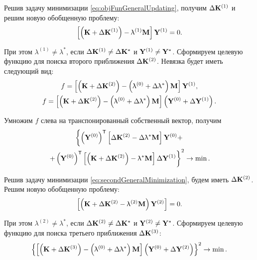 Решив задачу минимизации \eqref{eq:objFunGeneralUpdating}, получим $ \Delta \mathbf{K} ^ {(1)} $ и решим новую обобщенную проблему:
\begin{equation}
	\left[ \left( \mathbf{K} + \Delta \mathbf{K} ^ {(1)} \right) - \uplambda ^ {(1)} \mathbf{M} \right] \mathbf{Y} ^ {(1)} = 0.
\end{equation}

При этом $ \lambda ^ {(1)} \neq \lambda ^ \ast $, если $ \Delta \mathbf{K} ^ {(1)} \neq \Delta \mathbf{K} ^ \ast $ и $ \mathbf{Y} ^ {(1)} \neq \mathbf{Y} ^ \ast $. Сформируем целевую функцию для поиска второго приближения $ \Delta \mathbf{K} ^ {(2)} $. Невязка будет иметь следующий вид:
\begin{gather*}
	f = \left[ \left( \mathbf{K} + \Delta \mathbf{K} ^ {(2)} \right) - \left( \uplambda ^ {(0)} + \Delta \uplambda ^ \ast \right) \mathbf{M} \right] \mathbf{Y} ^ {(1)}, \\
	f = \left[ \left( \mathbf{K} + \Delta \mathbf{K} ^ {(2)} \right) - \left( \uplambda ^ {(0)} + \Delta \uplambda ^ \ast \right) \mathbf{M} \right] \left( \mathbf{Y} ^ {(0)} + \Delta \mathbf{Y} ^ {(1)} \right).
\end{gather*}

Умножим $ f $ слева на транспонированный собственный вектор, получим
\begin{gather}
	\left\{ \left( \mathbf{Y} ^ {(0)} \right) ^ \mathsf{T} \left[ \Delta \mathbf{K} ^ {(2)} - \Delta \uplambda ^ \ast \mathbf{M} \right] \mathbf{Y} ^ {(0)} + \right. \nonumber \\
	\left. + \left( \mathbf{Y} ^ {(0)} \right) ^ \mathsf{T} \left[ \left( \mathbf{K} + \Delta \mathbf{K} ^ {(2)} \right) - \uplambda ^ \ast \mathbf{M} \right] \Delta \mathbf{Y} ^ {(1)} \right\} ^ 2 \rightarrow \min.
	\label{eq:secondGeneralMinimization}
\end{gather}

Решив задачу минимизации \eqref{eq:secondGeneralMinimization}, будем иметь $ \Delta \mathbf{K} ^ {(2)} $. Решим новую обобщенную проблему:
\begin{equation*}
	\left[ \left( \mathbf{K} + \Delta \mathbf{K} ^ {(2)} - \uplambda ^ {(2)} \mathbf{M} \right) \mathbf{Y} ^ {(2)} \right] = 0.
\end{equation*}

При этом $ \lambda ^ {(2)} \neq \lambda ^ \ast $, если $ \Delta \mathbf{K} ^ {(2)} \neq \Delta \mathbf{K} ^ \ast $ и $ \mathbf{Y} ^ {(2)} \neq \mathbf{Y} ^ \ast $. Сформируем целевую функцию для поиска третьего приближения $ \Delta \mathbf{K} ^ {(3)} $:
\begin{equation*}
	\left\{ \left[ \left( \mathbf{K} + \Delta \mathbf{K} ^ {(3)} \right) - \left( \uplambda ^ {(0)} + \Delta \uplambda ^ \ast \right) \mathbf{M} \right] \left( \mathbf{Y} ^ {(0)} + \Delta \mathbf{Y} ^ {(2)} \right) \right\} ^ 2 \rightarrow \min.
\end{equation*}


